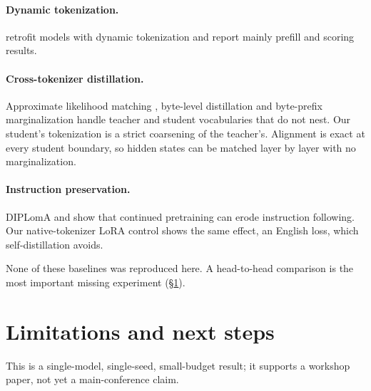 \documentclass[11pt]{article}
\begin{document}
\paragraph{Dynamic tokenization.} \citet{feher-etal-2025-retrofitting} retrofit models with dynamic tokenization and report mainly prefill and scoring results.

\paragraph{Cross-tokenizer distillation.} Approximate likelihood matching \citep{minixhofer2025alm}, byte-level distillation \citep{singh2026bytelevel} and byte-prefix marginalization \citep{wang2026byteprefix} handle teacher and student vocabularies that do not nest. Our student's tokenization is a strict coarsening of the teacher's. Alignment is exact at every student boundary, so hidden states can be matched layer by layer with no marginalization.

\paragraph{Instruction preservation.} DIPLomA \citep{sarasua-etal-2025-diploma} and \citet{li2025mixcpt} show that continued pretraining can erode instruction following. Our native-tokenizer LoRA control shows the same effect, an English loss, which self-distillation avoids.

None of these baselines was reproduced here. A head-to-head comparison is the most important missing experiment (\S\ref{sec:limits}).

\section{Limitations and next steps}
\label{sec:limits}

This is a single-model, single-seed, small-budget result; it supports a workshop paper, not yet a main-conference claim.
\end{document}
